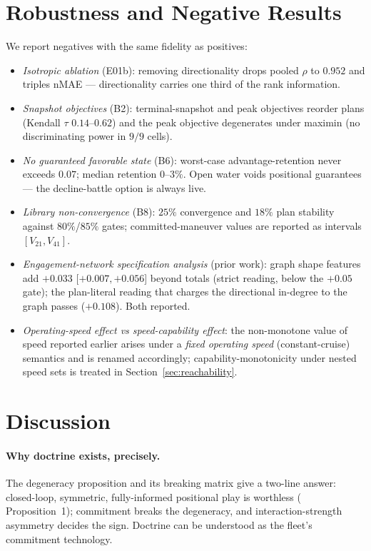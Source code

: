\documentclass[12pt,a4paper]{article}
\begin{document}
\section{Robustness and Negative Results}\label{sec:negative}

We report negatives with the same fidelity as positives:
\begin{itemize}
\item \emph{Isotropic ablation} (E01b): removing directionality drops
pooled $\rho$ to $0.952$ and triples nMAE --- directionality carries one
third of the rank information.
\item \emph{Snapshot objectives} (B2): terminal-snapshot and peak
objectives reorder plans (Kendall $\tau$ $0.14$--$0.62$) and the peak
objective degenerates under maximin (no discriminating power in $9/9$
cells).
\item \emph{No guaranteed favorable state} (B6): worst-case
advantage-retention never exceeds $0.07$; median retention $0$--$3\%$.
Open water voids positional guarantees --- the decline-battle option is
always live.
\item \emph{Library non-convergence} (B8): $25\%$ convergence and $18\%$
plan stability against $80\%$/$85\%$ gates; committed-maneuver values are
reported as intervals $[V_{21},V_{41}]$.
\item \emph{Engagement-network specification analysis} (prior work): graph
shape features add $+0.033$ [$+0.007,+0.056$] beyond totals (strict
reading, below the $+0.05$ gate); the plan-literal reading that charges
the directional in-degree to the graph passes ($+0.108$).  Both reported.
\item \emph{Operating-speed effect vs speed-capability effect}: the
non-monotone value of speed reported earlier arises under a
\emph{fixed operating speed} (constant-cruise) semantics and is renamed
accordingly; capability-monotonicity under nested speed sets is treated
in Section~\ref{sec:reachability}.
\end{itemize}

\section{Discussion}\label{sec:discussion}

\paragraph{Why doctrine exists, precisely.}  The degeneracy proposition and
its breaking matrix give a two-line answer: closed-loop, symmetric,
fully-informed positional play is worthless ( Proposition~1); commitment
breaks the degeneracy, and interaction-strength asymmetry decides the
sign.  Doctrine can be understood as the fleet's commitment technology.
\end{document}
